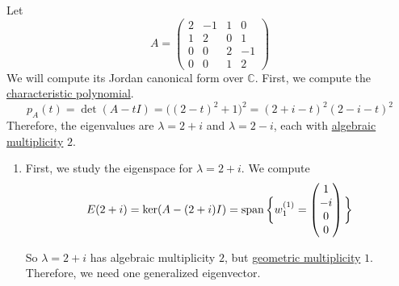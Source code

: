 	\begin{example}
	  \label{ex:real-matrix-with-4-complex-eigenvalues}
		Let
		\begin{equation}
			A =
			\begin{pmatrix}
				2 & -1 & 1 & 0 \\
				1 & 2 & 0 & 1 \\
				0 & 0 & 2 & -1 \\
				0 & 0 & 1 & 2
			\end{pmatrix}
		\end{equation}
		We will compute its Jordan canonical form over $\mathbb{C}$. First, we compute the \hyperref[def:characteristic-polynomial]{characteristic polynomial}.
		\begin{equation}
			p_A(t) = \det(A - tI) = \big((2 - t)^2 + 1\big)^2 = (2+i-t)^2(2-i-t)^2
		\end{equation}
		Therefore, the eigenvalues are $\lambda = 2+i$ and $\lambda = 2-i$, each with \hyperref[def:algebraic-multiplicity]{algebraic multiplicity} $2$.

		\begin{enumerate}
			\item First, we study the eigenspace for $\lambda = 2+i$. We compute
				\begin{equation}
					E(2+i) = \ker(A - (2+i)I)
					= \operatorname{span} \bigg\{
					w_1^{(1)} =
					\begin{pmatrix}
						1 \\
						-i \\
						0 \\
						0
					\end{pmatrix}
					\bigg\}
				\end{equation}

				So $\lambda = 2+i$ has algebraic multiplicity $2$, but \hyperref[def:geometric-multiplicity]{geometric multiplicity} $1$. Therefore, we need one generalized eigenvector.


\end{enumerate}
\end{example}

